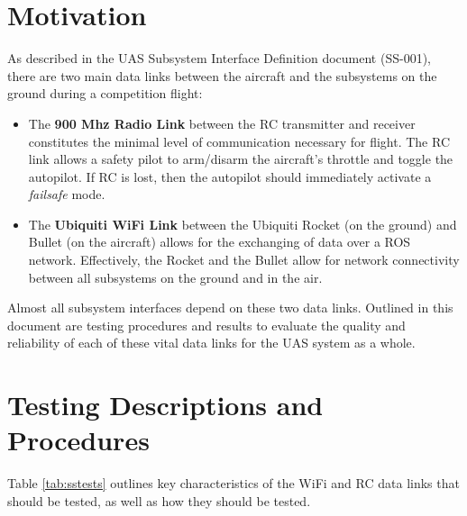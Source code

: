 \documentclass[]{auvsi_doc}
\begin{document}
\begin{AUVSITitlePage}
\begin{artifacttable}
\end{artifacttable}
\end{AUVSITitlePage}

\section{Motivation}

As described in the UAS Subsystem Interface Definition document (SS-001), there are two main data links between the aircraft and the subsystems on the ground during a competition flight:

\begin{itemize}
	\item The \textbf{900 Mhz Radio Link} between the RC transmitter and receiver constitutes the minimal level of communication necessary for flight. The RC link allows a safety pilot to arm/disarm the aircraft's throttle and toggle the autopilot. If RC is lost, then the autopilot should immediately activate a \textit{failsafe} mode.
	\item The \textbf{Ubiquiti WiFi Link} between the Ubiquiti Rocket (on the ground) and Bullet (on the aircraft) allows for the exchanging of data over a ROS network. Effectively, the Rocket and the Bullet allow for network connectivity between all subsystems on the ground and in the air.
\end{itemize}

Almost all subsystem interfaces depend on these two data links. Outlined in this document are testing procedures and results to evaluate the quality and reliability of each of these vital data links for the UAS system as a whole.

\section{Testing Descriptions and Procedures}

Table \ref{tab:sstests} outlines key characteristics of the WiFi and RC data links that should be tested, as well as how they should be tested.
\end{document}
